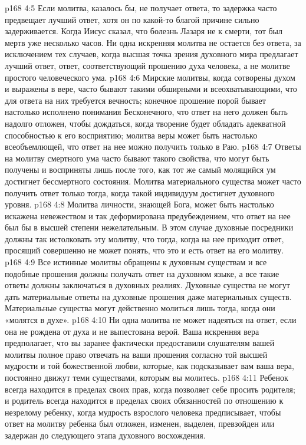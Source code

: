 \vs p168 4:5 \bibnobreakspace Если молитва, казалось бы, не получает ответа, то задержка часто предвещает лучший ответ, хотя он по какой\hyp{}то благой причине сильно задерживается. Когда Иисус сказал, что болезнь Лазаря не к смерти, тот был мертв уже несколько часов. Ни одна искренняя молитва не остается без ответа, за исключением тех случаев, когда высшая точка зрения духовного мира предлагает лучший ответ, ответ, соответствующий прошению духа человека, а не молитве простого человеческого ума.
\vs p168 4:6 \bibnobreakspace Мирские молитвы, когда сотворены духом и выражены в вере, часто бывают такими обширными и всеохватывающими, что для ответа на них требуется вечность; конечное прошение порой бывает настолько исполнено понимания Бесконечного, что ответ на него должен быть надолго отложен, чтобы дождаться, когда творение будет обладать адекватной способностью к его восприятию; молитва веры может быть настолько всеобъемлющей, что ответ на нее можно получить только в Раю.
\vs p168 4:7 \bibnobreakspace Ответы на молитву смертного ума часто бывают такого свойства, что могут быть получены и восприняты лишь после того, как тот же самый молящийся ум достигнет бессмертного состояния. Молитва материального существа может часто получить ответ только тогда, когда такой индивидуум достигнет духовного уровня.
\vs p168 4:8 \bibnobreakspace Молитва личности, знающей Бога, может быть настолько искажена невежеством и так деформирована предубеждением, что ответ на нее был бы в высшей степени нежелательным. В этом случае духовные посредники должны так истолковать эту молитву, что тогда, когда на нее приходит ответ, просящий совершенно не может понять, что это и есть ответ на его молитву.
\vs p168 4:9 \bibnobreakspace Все истинные молитвы обращены к духовным существам и все подобные прошения должны получать ответ на духовном языке, а все такие ответы должны заключаться в духовных реалиях. Духовные существа не могут дать материальные ответы на духовные прошения даже материальных существ. Материальные существа могут действенно молиться лишь тогда, когда они «молятся в духе».
\vs p168 4:10 \bibnobreakspace Ни одна молитва не может надеяться на ответ, если она не рождена от духа и не выпестована верой. Ваша искренняя вера предполагает, что вы заранее фактически предоставили слушателям вашей молитвы полное право отвечать на ваши прошения согласно той высшей мудрости и той божественной любви, которые, как подсказывает вам ваша вера, постоянно движут теми существами, которым вы молитесь.
\vs p168 4:11 \bibnobreakspace Ребенок всегда находится в пределах своих прав, когда позволяет себе просить родителя; и родитель всегда находится в пределах своих обязанностей по отношению к незрелому ребенку, когда мудрость взрослого человека предписывает, чтобы ответ на молитву ребенка был отложен, изменен, выделен, превзойден или задержан до следующего этапа духовного восхождения.
